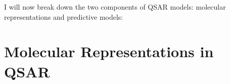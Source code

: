 I will now break down the two components of QSAR models: molecular representations and predictive models:


\section{Molecular Representations in QSAR}


